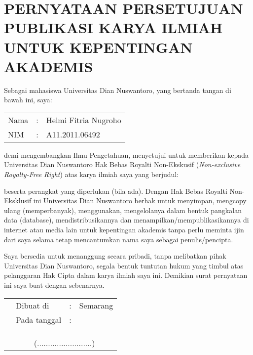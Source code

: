 \documentclass[laporan.tex]{subfiles}
\begin{document}
\chapter*{PERNYATAAN PERSETUJUAN PUBLIKASI KARYA ILMIAH UNTUK KEPENTINGAN AKADEMIS}

Sebagai mahasiswa Universitas Dian Nuswantoro, yang bertanda tangan di bawah ini, saya:

\begin{tabular}{l c l}
Nama & : & Helmi Fitria Nugroho \\
NIM & : & A11.2011.06492 \\
\end{tabular}

demi mengembangkan Ilmu Pengetahuan, menyetujui untuk memberikan kepada Universitas Dian Nuswantoro Hak Bebas Royalti Non-Ekskusif (\emph{Non-exclusive Royalty-Free Right}) atas karya ilmiah saya yang berjudul:

\begin{centering}
\vskip 1em
\end{centering}

beserta perangkat yang diperlukan (bila ada). Dengan Hak Bebas Royalti Non-Eksklusif ini Universitas Dian Nuswantoro berhak untuk menyimpan, mengcopy ulang (memperbanyak), menggunakan, mengelolanya dalam bentuk pangkalan data (database), mendistribusikannya dan menampilkan/mempublikasikannya di internet atau media lain untuk kepentingan akademis tanpa perlu meminta ijin dari saya selama tetap mencantumkan nama saya sebagai penulis/pencipta.

Saya bersedia untuk menanggung secara pribadi, tanpa melibatkan pihak Universitas Dian Nuswantoro, segala bentuk tuntutan hukum yang timbul atas pelanggaran Hak Cipta dalam karya ilmiah saya ini.
Demikian surat pernyataan ini saya buat dengan sebenarnya.

\begin{tabular}{p{18em} l c l}
& Dibuat di & : & Semarang \\
& Pada tanggal & : & \\
& & \\
& & \\
& & \\
& \multicolumn{3}{c}{(.........................)} \\
\end{tabular}
\end{document}
